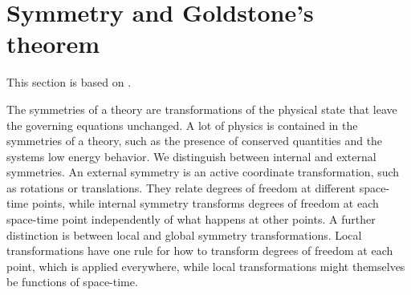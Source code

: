 \section{Symmetry and Goldstone's theorem}
\label{section:symmetry}

This section is based on \cite{Peskin:IntroQFT,weinberg_1995,weinberg_1996_vol2,smooth_manifolds}.

The symmetries of a theory are transformations of the physical state that leave the governing equations unchanged.
A lot of physics is contained in the symmetries of a theory, such as the presence of conserved quantities and the systems low energy behavior.
We distinguish between internal and external symmetries.
An external symmetry is an active coordinate transformation, such as rotations or translations.
They relate degrees of freedom at different space-time points, while internal symmetry transforms degrees of freedom at each space-time point independently of what happens at other points.
A further distinction is between local and global symmetry transformations.
Local transformations have one rule for how to transform degrees of freedom at each point, which is applied everywhere, while local transformations might themselves be functions of space-time.

